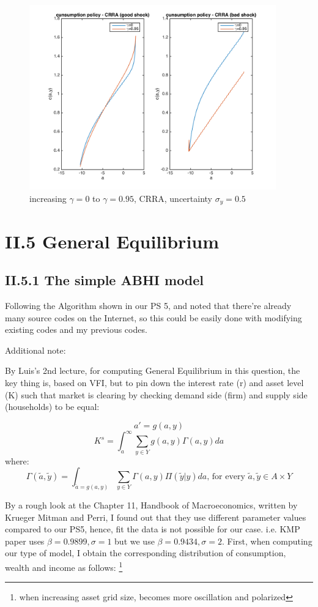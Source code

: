 \documentclass{article}[a4paper]
\begin{document}
\begin{figure}[htbp]
\centering
\includegraphics[width=\textwidth,height=8cm]{img/425.png}
\caption{increasing $\gamma = 0$ to $\gamma= 0.95$, CRRA, uncertainty $\sigma_y=0.5$}
\end{figure}





\pagebreak
\section{II.5 General Equilibrium}
\subsection{II.5.1 The simple ABHI model}

Following the Algorithm shown in our PS 5, and noted that there're already many source codes on the Internet, so this could be easily done with modifying existing codes and my previous codes.

Additional note:

By Luis's 2nd lecture, for computing General Equilibrium in this question, the key thing is, based on VFI, but to pin down the interest rate (r) and asset level (K) such that market is clearing  by checking demand side (firm) and supply side (households) to be equal:

\[ a' = g(a,y)\]
\[ K^{s} = \int_{a}^{\infty} \sum_{y\in Y}g(a,y)\Gamma (a,y) da \]
where: \[ \Gamma (\tilde{a},\tilde{y}) = \int_{\tilde{a}=g(a,y)} \sum_{y\in Y}\Gamma (a,y) \Pi (\tilde{y}|y)da \text{, for every } \tilde{a}, \tilde{y} \in A \times Y \]  


By a rough look at the Chapter 11, Handbook of Macroeconomics, written by Krueger Mitman and Perri, I found out that they use different parameter values compared to our PS5, hence, fit the data is not possible for our case. i.e. KMP paper uses $\beta=0.9899, \sigma=1$ but we use $\beta=0.9434, \sigma=2$.
First, when computing our type of model, I obtain the corresponding distribution of consumption, wealth and income as follows: \footnote{when increasing asset grid size, becomes more oscillation and polarized}
\end{document}
